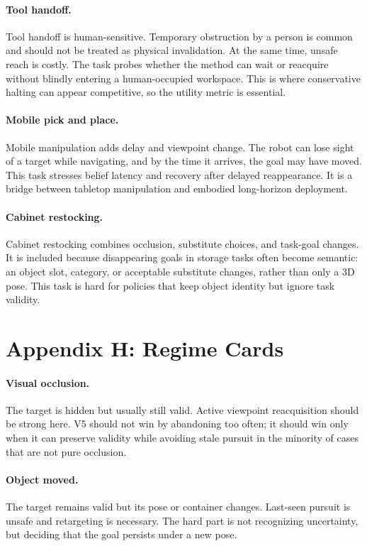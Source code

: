 \documentclass{article}
\begin{document}
\paragraph{Tool handoff.}
Tool handoff is human-sensitive. Temporary obstruction by a person is common and should not be treated as physical invalidation. At the same time, unsafe reach is costly. The task probes whether the method can wait or reacquire without blindly entering a human-occupied workspace. This is where conservative halting can appear competitive, so the utility metric is essential.

\paragraph{Mobile pick and place.}
Mobile manipulation adds delay and viewpoint change. The robot can lose sight of a target while navigating, and by the time it arrives, the goal may have moved. This task stresses belief latency and recovery after delayed reappearance. It is a bridge between tabletop manipulation and embodied long-horizon deployment.

\paragraph{Cabinet restocking.}
Cabinet restocking combines occlusion, substitute choices, and task-goal changes. It is included because disappearing goals in storage tasks often become semantic: an object slot, category, or acceptable substitute changes, rather than only a 3D pose. This task is hard for policies that keep object identity but ignore task validity.

\section{Appendix H: Regime Cards}
\paragraph{Visual occlusion.}
The target is hidden but usually still valid. Active viewpoint reacquisition should be strong here. V5 should not win by abandoning too often; it should win only when it can preserve validity while avoiding stale pursuit in the minority of cases that are not pure occlusion.

\paragraph{Object moved.}
The target remains valid but its pose or container changes. Last-seen pursuit is unsafe and retargeting is necessary. The hard part is not recognizing uncertainty, but deciding that the goal persists under a new pose.
\end{document}
